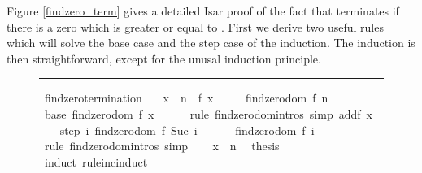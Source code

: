 \begin{isabellebody}
\begin{isamarkuptext}
  Figure \ref{findzero_term} gives a detailed Isar proof of the fact
  that  terminates if there is a zero which is greater
  or equal to . First we derive two useful rules which will
  solve the base case and the step case of the induction. The
  induction is then straightforward, except for the unusal induction
  principle.%
\end{isamarkuptext}%
\isamarkuptrue%
%
\begin{figure}
\hrule\vspace{6pt}
\begin{minipage}{0.8\textwidth}
\isastyle\isamarkuptrue
{}\isamarkupfalse%
\ findzero{\isacharunderscore}termination{\isacharcolon}\isanewline
\ \ \ {\isachardoublequoteopen}x\ {\isasymge}\ n{\isachardoublequoteclose}\ \ {\isachardoublequoteopen}f\ x\ {\isacharequal}\ {}{\isachardoublequoteclose}\isanewline
\ \ \ {\isachardoublequoteopen}findzero{\isacharunderscore}dom\ {\isacharparenleft}f{\isacharcomma}\ n{\isacharparenright}{\isachardoublequoteclose}\isanewline
%
\isadelimproof
%
\endisadelimproof
%
\isatagproof
{}\isamarkupfalse%
\ {\isacharminus}\ \isanewline
\ \ \isamarkupfalse%
\ base{\isacharcolon}\ {\isachardoublequoteopen}findzero{\isacharunderscore}dom\ {\isacharparenleft}f{\isacharcomma}\ x{\isacharparenright}{\isachardoublequoteclose}\isanewline
\ \ \ \ \isamarkupfalse%
\ {\isacharparenleft}rule\ findzero{\isachardot}domintros{\isacharparenright}\ {\isacharparenleft}simp\ add{\isacharcolon}{\isacharbackquoteopen}f\ x\ {\isacharequal}\ {}{\isacharbackquoteclose}{\isacharparenright}\isanewline
\isanewline
\ \ \isamarkupfalse%
\ step{\isacharcolon}\ {\isachardoublequoteopen}{\isasymAnd}i{\isachardot}\ findzero{\isacharunderscore}dom\ {\isacharparenleft}f{\isacharcomma}\ Suc\ i{\isacharparenright}\ \isanewline
\ \ \ \ {\isasymLongrightarrow}\ findzero{\isacharunderscore}dom\ {\isacharparenleft}f{\isacharcomma}\ i{\isacharparenright}{\isachardoublequoteclose}\isanewline
\ \ \ \ \isamarkupfalse%
\ {\isacharparenleft}rule\ findzero{\isachardot}domintros{\isacharparenright}\ simp\isanewline
\isanewline
\ \ \isamarkupfalse%
\ {\isacharbackquoteopen}x\ {\isasymge}\ n{\isacharbackquoteclose}\ \isamarkupfalse%
\ {\isacharquery}thesis\isanewline
\ \ \isamarkupfalse%
\ {\isacharparenleft}induct\ rule{\isacharcolon}inc{\isacharunderscore}induct{\isacharparenright}\isanewline

\end{minipage}
\end{figure}
\end{isabellebody}
